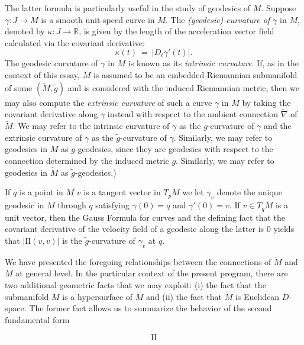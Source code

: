 \documentclass[11pt]{article}
\newcommand{\benn}{\begin{equation*}}
\newcommand{\eenn}{\end{equation*}}
\newcommand{\R}{\ensuremath{\mathbb{R}}}
\numberwithin{equation}{section}
\begin{document}
The latter formula is particularly useful in the study of geodesics of $M$. Suppose $\gamma: J \to M$ is a smooth unit-speed curve in $M$. The \emph{(geodesic) curvature of $\gamma$} in $M$, denoted by $\kappa: J \to \R$, is given by the length of the acceleration vector field calculated via the covariant derivative:
\benn
	\kappa(t) \ = \ | D_t \gamma'(t) |.
\eenn
The geodesic curvature of $\gamma$ in $M$ is known as its \emph{intrinsic curvature}. If, as in the context of this essay, $M$ is assumed to be an embedded Riemannian submanifold of some $(\tilde{M}, \tilde{g})$ and is considered with the induced Riemannian metric, then we may also compute the \emph{extrinsic curvature} of such a curve $\gamma$ in $M$ by taking the covariant derivative along $\gamma$ instead with respect to the ambient connection $\tilde{\nabla}$ of $\tilde{M}$. We may refer to the intrinsic curvature of $\gamma$ as the $g$-curvature of $\gamma$ and the extrinsic curvature of $\gamma$ as the $\tilde{g}$-curvature of $\gamma$. Similarly, we may refer to geodesics in $M$ as $g$-geodesics, since they are geodesics with respect to the connection determined by the induced metric $g$. Similarly, we may refer to geodesics in $\tilde{M}$ as $\tilde{g}$-geodesics.)

If $q$ is a point in $M$ $v$ is a tangent vector in $T_p M$ we let $\gamma_v$ denote the unique geodesic in $M$ through $q$ satisfying $\gamma(0) = q$ and $\gamma'(0) = v$. If $v \in T_q M$ is a unit vector, then the Gauss Formula for curves and the defining fact that the covariant derivative of the velocity field of a geodesic along the latter is 0 yields that $|\mathrm{II}(v, v)|$ is the $\tilde{g}$-curvature of $\gamma_v$ at $q$.

We have presented the foregoing relationships between the connections of $\tilde{M}$ and $M$ at general level. In the particular context of the present program, there are two additional geometric facts that we may exploit: (i) the fact that the submanifold $M$ is a hypersurface of $\tilde{M}$ and (ii) the fact that $\tilde{M}$ is Euclidean $D$-space. The former fact allows us to summarize the behavior of the second fundamental form 

\benn
\mathrm{II}
\eenn
\end{document}
